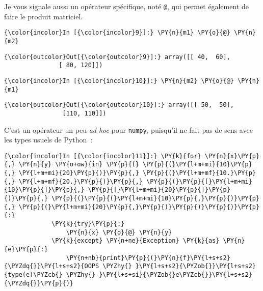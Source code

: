     Je vous signale aussi un opérateur spécifique, noté \texttt{@}, qui
permet également de faire le produit matriciel.

    \begin{Verbatim}[commandchars=\\\{\},frame=single,framerule=0.3mm,rulecolor=\color{cellframecolor}]
{\color{incolor}In [{\color{incolor}9}]:} \PY{n}{m1} \PY{o}{@} \PY{n}{m2}
\end{Verbatim}


\begin{Verbatim}[commandchars=\\\{\},frame=single,framerule=0.3mm,rulecolor=\color{cellframecolor}]
{\color{outcolor}Out[{\color{outcolor}9}]:} array([[ 40,  60],
               [ 80, 120]])
\end{Verbatim}
            
    \begin{Verbatim}[commandchars=\\\{\},frame=single,framerule=0.3mm,rulecolor=\color{cellframecolor}]
{\color{incolor}In [{\color{incolor}10}]:} \PY{n}{m2} \PY{o}{@} \PY{n}{m1}
\end{Verbatim}


\begin{Verbatim}[commandchars=\\\{\},frame=single,framerule=0.3mm,rulecolor=\color{cellframecolor}]
{\color{outcolor}Out[{\color{outcolor}10}]:} array([[ 50,  50],
                [110, 110]])
\end{Verbatim}
            
    C'est un opérateur un peu \emph{ad hoc} pour \texttt{numpy}, puisqu'il
ne fait pas de sens avec les types usuels de Python~:

    \begin{Verbatim}[commandchars=\\\{\},frame=single,framerule=0.3mm,rulecolor=\color{cellframecolor}]
{\color{incolor}In [{\color{incolor}11}]:} \PY{k}{for} \PY{n}{x}\PY{p}{,} \PY{n}{y} \PY{o+ow}{in} \PY{p}{(} \PY{p}{(}\PY{l+m+mi}{10}\PY{p}{,} \PY{l+m+mi}{20}\PY{p}{)}\PY{p}{,} \PY{p}{(}\PY{l+m+mf}{10.}\PY{p}{,} \PY{l+m+mf}{20.}\PY{p}{)}\PY{p}{,} \PY{p}{(}\PY{p}{[}\PY{l+m+mi}{10}\PY{p}{]}\PY{p}{,} \PY{p}{[}\PY{l+m+mi}{20}\PY{p}{]}\PY{p}{)}\PY{p}{,} \PY{p}{(}\PY{p}{(}\PY{l+m+mi}{10}\PY{p}{,}\PY{p}{)}\PY{p}{,} \PY{p}{(}\PY{l+m+mi}{20}\PY{p}{,}\PY{p}{)}\PY{p}{)}\PY{p}{)}\PY{p}{:}
             \PY{k}{try}\PY{p}{:}
                 \PY{n}{x} \PY{o}{@} \PY{n}{y}
             \PY{k}{except} \PY{n+ne}{Exception} \PY{k}{as} \PY{n}{e}\PY{p}{:}
                 \PY{n+nb}{print}\PY{p}{(}\PY{n}{f}\PY{l+s+s2}{\PYZdq{}}\PY{l+s+s2}{OOPS \PYZhy{} }\PY{l+s+s2}{\PYZob{}}\PY{l+s+s2}{type(e)\PYZcb{} \PYZhy{} }\PY{l+s+si}{\PYZob{}e\PYZcb{}}\PY{l+s+s2}{\PYZdq{}}\PY{p}{)}
\end{Verbatim}


